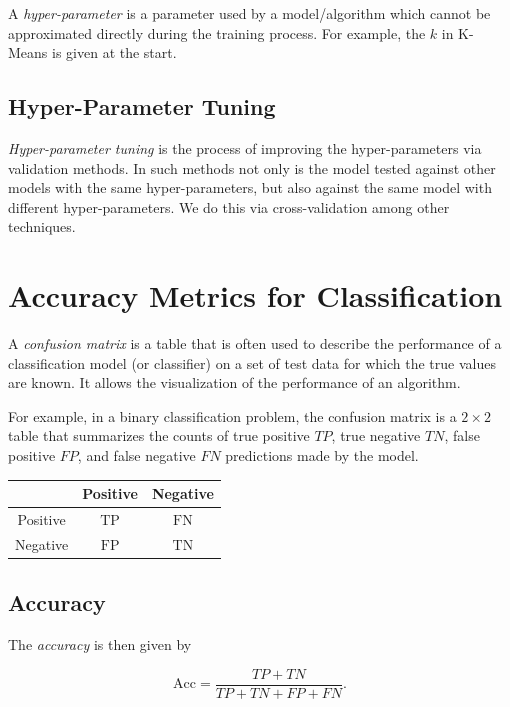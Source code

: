 A \emph{hyper-parameter} is a parameter used by a model/algorithm which cannot be approximated directly during the training process.
For example, the \(k\) in K-Means is given at the start.

\subsection{Hyper-Parameter Tuning}

\emph{Hyper-parameter tuning} is the process of improving the hyper-parameters via validation methods. In such methods not only is the model
tested against other models with the same hyper-parameters, but also against the same model with different hyper-parameters. We do this via 
cross-validation among other techniques.

\section{Accuracy Metrics for Classification}

A \emph{confusion matrix} is a table that is often used to describe the performance of a classification model (or classifier) on a set of test data for
which the true values are known. It allows the visualization of the performance of an algorithm.

For example, in a binary classification problem, the confusion matrix is a \(2\times2\) table that summarizes the counts of true positive \(TP\),
true negative \(TN\), false positive \(FP\), and false negative \(FN\) predictions made by the model.

\begin{center}
	\begin{tabular}{|c|c|c|}
	\hline
			 & Positive 		& Negative 		 \\ 
	\hline
	Positive & \(\mathrm{TP}\) & \(\mathrm{FN}\) \\ 
	\hline
	Negative & \(\mathrm{FP}\) & \(\mathrm{TN}\) \\ 
	\hline
\end{tabular}

\end{center}

\subsection{Accuracy}

The \emph{accuracy} is then given by

\[
	\mathrm{Acc} = \frac{TP + TN}{TP + TN + FP + FN}.
\]


